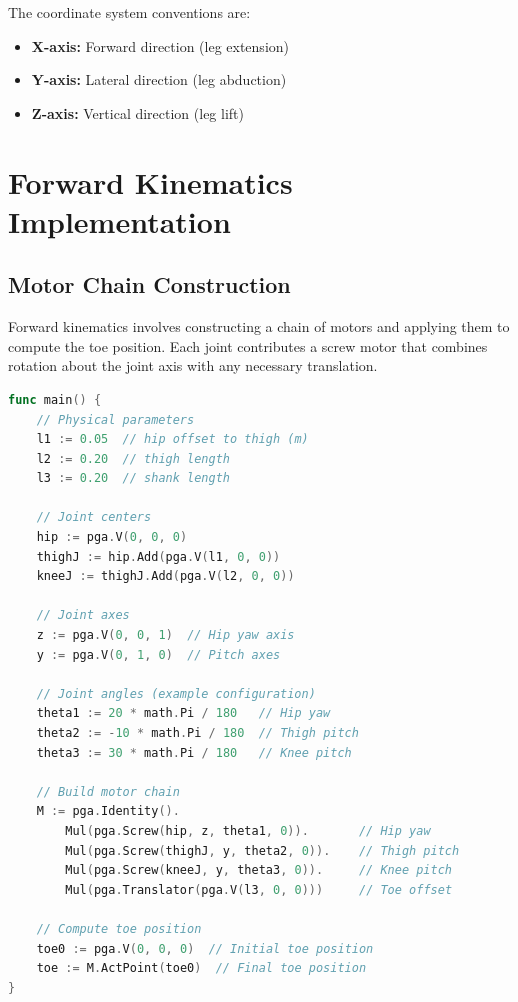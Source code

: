 \documentclass[11pt]{article}
\begin{document}
The coordinate system conventions are:
\begin{itemize}
    \item \textbf{X-axis:} Forward direction (leg extension)
    \item \textbf{Y-axis:} Lateral direction (leg abduction)  
    \item \textbf{Z-axis:} Vertical direction (leg lift)
\end{itemize}

\section{Forward Kinematics Implementation}

\subsection{Motor Chain Construction}

Forward kinematics involves constructing a chain of motors and applying them to compute the toe position. Each joint contributes a screw motor that combines rotation about the joint axis with any necessary translation.

\begin{lstlisting}[language=Go, caption=Forward kinematics implementation in Go]
func main() {
    // Physical parameters
    l1 := 0.05  // hip offset to thigh (m)
    l2 := 0.20  // thigh length  
    l3 := 0.20  // shank length

    // Joint centers
    hip := pga.V(0, 0, 0)
    thighJ := hip.Add(pga.V(l1, 0, 0))
    kneeJ := thighJ.Add(pga.V(l2, 0, 0))

    // Joint axes
    z := pga.V(0, 0, 1)  // Hip yaw axis
    y := pga.V(0, 1, 0)  // Pitch axes

    // Joint angles (example configuration)
    theta1 := 20 * math.Pi / 180   // Hip yaw
    theta2 := -10 * math.Pi / 180  // Thigh pitch  
    theta3 := 30 * math.Pi / 180   // Knee pitch

    // Build motor chain
    M := pga.Identity().
        Mul(pga.Screw(hip, z, theta1, 0)).       // Hip yaw
        Mul(pga.Screw(thighJ, y, theta2, 0)).    // Thigh pitch
        Mul(pga.Screw(kneeJ, y, theta3, 0)).     // Knee pitch  
        Mul(pga.Translator(pga.V(l3, 0, 0)))     // Toe offset

    // Compute toe position
    toe0 := pga.V(0, 0, 0)  // Initial toe position
    toe := M.ActPoint(toe0)  // Final toe position
}
\end{lstlisting}
\end{document}
